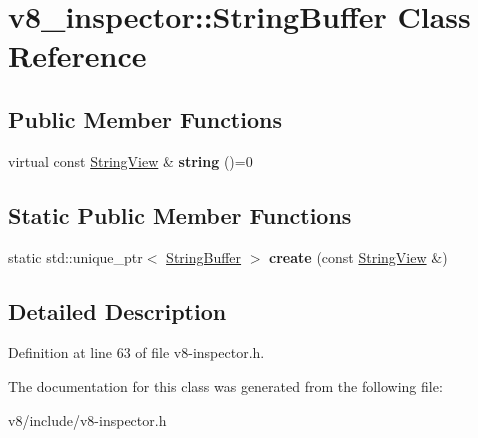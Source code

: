 \hypertarget{classv8__inspector_1_1StringBuffer}{}\section{v8\+\_\+inspector\+:\+:String\+Buffer Class Reference}
\label{classv8__inspector_1_1StringBuffer}
\subsection*{Public Member Functions}
\begin{DoxyCompactItemize}
\item 
\mbox{\label{classv8__inspector_1_1StringBuffer_a72806809fe0fc2d2ad3f52fe934e9e07}} 
virtual const \mbox{\hyperlink{classv8__inspector_1_1StringView}{String\+View}} \& {\bfseries string} ()=0
\end{DoxyCompactItemize}
\subsection*{Static Public Member Functions}
\begin{DoxyCompactItemize}
\item 
\mbox{\label{classv8__inspector_1_1StringBuffer_a1c067f19a39fb3ee3a5c3b9107fbb5da}} 
static std\+::unique\+\_\+ptr$<$ \mbox{\hyperlink{classv8__inspector_1_1StringBuffer}{String\+Buffer}} $>$ {\bfseries create} (const \mbox{\hyperlink{classv8__inspector_1_1StringView}{String\+View}} \&)
\end{DoxyCompactItemize}


\subsection{Detailed Description}


Definition at line 63 of file v8-\/inspector.\+h.



The documentation for this class was generated from the following file\+:\begin{DoxyCompactItemize}
\item 
v8/include/v8-\/inspector.\+h\end{DoxyCompactItemize}
